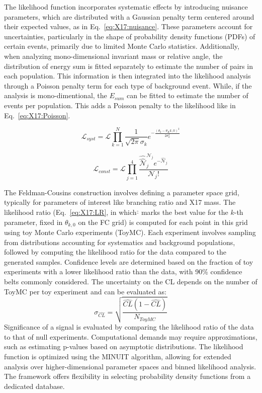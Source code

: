 \begin{refsection}
        \noindent
        The likelihood function incorporates systematic effects by introducing nuisance parameters, which are distributed with a Gaussian penalty term centered around their expected values, as in Eq.~\ref{eq:X17:nuisance}. 
        These parameters account for uncertainties, particularly in the shape of probability density functions (PDFs) of certain events, primarily due to limited Monte Carlo statistics. Additionally, when analyzing mono-dimensional invariant mass or relative angle, the distribution of energy sum is fitted separately to estimate the number of pairs in each population. This information is then integrated into the likelihood analysis through a Poisson penalty term for each type of background event.
        While, if the analysis is mono-dimentional, the $E_{sum}$ can be fitted to estimate the number of events per population.
        This adds a Poisson penalty to the likelihood like in Eq.~\ref{eq:X17:Poisson}.
        
        
        \begin{equation}
        \label{eq:X17:nuisance}
            \mathcal{L}_{syst} = \mathcal{L} \prod_{k=1}^N \frac{1}{\sqrt{2\pi}\sigma_k} e^{-\frac{(\theta_k-\theta_K{k,0})^2}{2\sigma_k^2}}
        \end{equation}

        \begin{equation}
        \label{eq:X17:Poisson}
            \mathcal{L}_{const} = \mathcal{L} \prod_{j=1}^4 \frac{\hat{\hat{\mathcal{N}}}_j^{\mathcal{N}_j}e^{-\hat{\mathcal{N}}_j}}{\mathcal{N}_j!}
        \end{equation}

        \noindent
        The Feldman-Cousins construction involves defining a parameter space grid, typically for parameters of interest like branching ratio and X17 mass. 
        The likelihood ratio (Eq.~\ref{eq:X17:LR}, in which $\hat{\hat{}}$ marks the best value for the $k$-th parameter, fixed in $\theta_{k,0}$ on the FC grid) is computed for each point in this grid using toy Monte Carlo experiments (ToyMC). 
        Each experiment involves sampling from distributions accounting for systematics and background populations, followed by computing the likelihood ratio for the data compared to the generated samples. 
        Confidence levels are determined based on the fraction of toy experiments with a lower likelihood ratio than the data, with 90\% confidence belts commonly considered. 
        The uncertainty on the CL depends on the number of ToyMC per toy experiment and can be evaluated as:
        $$\sigma_{\hat{CL}} = \sqrt{\frac{\hat{CL}(1-\hat{CL})}{N_{ToyMC}}}$$
        Significance of a signal is evaluated by comparing the likelihood ratio of the data to that of null experiments. 
        Computational demands may require approximations, such as estimating p-values based on asymptotic distributions. 
        The likelihood function is optimized using the MINUIT algorithm, allowing for extended analysis over higher-dimensional parameter spaces and binned likelihood analysis. 
        The framework offers flexibility in selecting probability density functions from a dedicated database.


\end{refsection}
